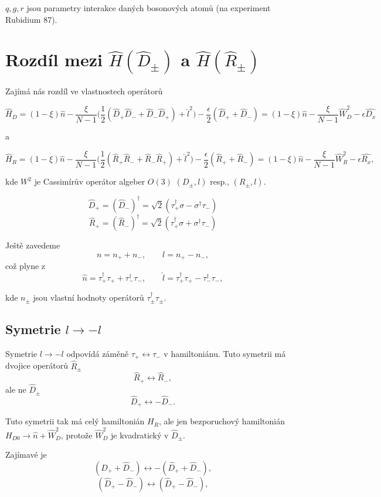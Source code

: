 \documentclass{article}
\begin{document}
$q,g,r$ jsou parametry interakce daných bosonových atomů (na experiment Rubidium 87).

\section{Rozdíl mezi $\hat{H}(\hat{D}_{\pm})$ a $\hat{H}(\hat{R}_{\pm})$}
Zajímá nás rozdíl ve vlastnostech operátorů

$$\hat{H}_D = (1 - \xi)\hat{n} - \frac{\xi}{N - 1}\bigg( \frac{1}{2}(\hat{D}_+\hat{D}_- + 
\hat{D}_-\hat{D}_+) + \hat{l}^2\bigg) - \frac{\epsilon}{2}(\hat{D}_+ + \hat{D}_-) =
(1 - \xi)\hat{n} - \frac{\xi}{N - 1} \hat{W}^2_D - \epsilon\hat{D_x}
$$

a

$$\hat{H}_R = (1 - \xi)\hat{n} - \frac{\xi}{N - 1}\bigg( \frac{1}{2}(\hat{R}_+\hat{R}_- + 
\hat{R}_-\hat{R}_+) + \hat{l}^2\bigg) - \frac{\epsilon}{2}(\hat{R}_+ + \hat{R}_-)
=(1 - \xi)\hat{n} - \frac{\xi}{N - 1} \hat{W}^2_R - \epsilon\hat{R_x},$$

kde $W^2$ je Cassimírův operátor algeber $O(3)$ $(D_{\pm},l)$ resp.,  $(R_{\pm},l)$.

$$\hat{D}_+ = (\hat{D}_-)^{\dagger} = \sqrt{2}(\tau_+^{\dagger}\sigma - \sigma^{\dagger}\tau_-) $$
$$\hat{R}_+ = (\hat{R}_-)^{\dagger} = \sqrt{2}(\tau_+^{\dagger}\sigma + \sigma^{\dagger}\tau_-) $$

Ještě zavedeme 
$$n = n_+ + n_-, \qquad l = n_+ - n_-,$$
což plyne z 
$$\hat{n} = \tau^{\dagger}_+\tau_+ + \tau^{\dagger}_-\tau_-, \qquad \hat{l} = \tau^{\dagger}_+\tau_+ - \tau^{\dagger}_-\tau_-,$$

kde $n_{\pm}$ jsou vlastní hodnoty operátorů $\tau^{\dagger}_{\pm}\tau_{\pm}$.

\subsection{Symetrie $l \rightarrow -l$ }
Symetrie $l \rightarrow -l$ odpovídá záměně  $\tau_+ \leftrightarrow \tau_-$ v hamiltoniánu. 
Tuto symetrii má dvojice operátorů $\hat{R}_{\pm}$
$$\hat{R}_{+} \leftrightarrow \hat{R}_{-},$$
ale ne $\hat{D}_{\pm}$
$$\hat{D}_{+} \leftrightarrow -\hat{D}_{-}.$$

Tuto symetrii tak má celý hamiltonián $H_R$, ale jen bezporuchový hamiltonián $H_{D0} \rightarrow
\hat{n} + \hat{W}^2_D$, protože $\hat{W}^2_D$ je kvadratický v $\hat{D}_{\pm}$.

Zajímavé je 
$$(\hat{D}_{+} + \hat{D}_{-}) \leftrightarrow -(\hat{D}_{+} + \hat{D}_{-}),  $$
$$(\hat{D}_{+} - \hat{D}_{-}) \leftrightarrow (\hat{D}_{+} - \hat{D}_{-}),  $$
\end{document}
